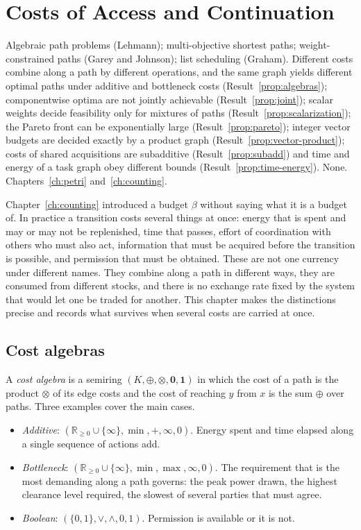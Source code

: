 \chapter{Costs of Access and Continuation}\label{ch:costs}
{Algebraic path problems (Lehmann); multi-objective shortest paths; weight-constrained paths (Garey and Johnson); list scheduling (Graham).}
{Different costs combine along a path by different operations, and the same graph yields different optimal paths under additive and bottleneck costs (Result~\ref{prop:algebras}); componentwise optima are not jointly achievable (Result~\ref{prop:joint}); scalar weights decide feasibility only for mixtures of paths (Result~\ref{prop:scalarization}); the Pareto front can be exponentially large (Result~\ref{prop:pareto}); integer vector budgets are decided exactly by a product graph (Result~\ref{prop:vector-product}); costs of shared acquisitions are subadditive (Result~\ref{prop:subadd}) and time and energy of a task graph obey different bounds (Result~\ref{prop:time-energy}).}
{None.}
{Chapters~\ref{ch:petri} and~\ref{ch:counting}.}

Chapter~\ref{ch:counting} introduced a budget $\beta$ without saying what it is a budget of. In practice a transition costs several things at once: energy that is spent and may or may not be replenished, time that passes, effort of coordination with others who must also act, information that must be acquired before the transition is possible, and permission that must be obtained. These are not one currency under different names. They combine along a path in different ways, they are consumed from different stocks, and there is no exchange rate fixed by the system that would let one be traded for another. This chapter makes the distinctions precise and records what survives when several costs are carried at once.

\section{Cost algebras}

A \emph{cost algebra} is a semiring $(K,\oplus,\otimes,\mathbf 0,\mathbf 1)$ in which the cost of a path is the product $\otimes$ of its edge costs and the cost of reaching $y$ from $x$ is the sum $\oplus$ over paths. Three examples cover the main cases.
\begin{itemize}[nosep]
  \item \emph{Additive}: $(\mathbb R_{\ge0}\cup\{\infty\},\min,+,\infty,0)$. Energy spent and time elapsed along a single sequence of actions add.
  \item \emph{Bottleneck}: $(\mathbb R_{\ge0}\cup\{\infty\},\min,\max,\infty,0)$. The requirement that is the most demanding along a path governs: the peak power drawn, the highest clearance level required, the slowest of several parties that must agree.
  \item \emph{Boolean}: $(\{0,1\},\vee,\wedge,0,1)$. Permission is available or it is not.
\end{itemize}

